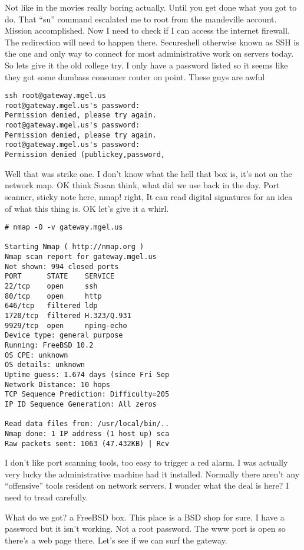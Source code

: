 Not like in the movies really boring actually. Until you get done what you got to do. That ``su'' command escalated me to root from the mandeville account. Mission accomplished. Now I need to check if I can access the internet firewall. The redirection will need to happen there. Secureshell otherwise known as SSH is the one and only way to connect for most administrative work on servers today. So lets give it the old college try. I only have a password listed so it seems like they got some dumbass consumer router on point. These guys are awful

\begin{verbatim}
ssh root@gateway.mgel.us
root@gateway.mgel.us's password: 
Permission denied, please try again.
root@gateway.mgel.us's password: 
Permission denied, please try again.
root@gateway.mgel.us's password: 
Permission denied (publickey,password,
\end{verbatim}

Well that was strike one. I don't know what the hell that box is, it's not on the network map. OK think Susan think, what did we use back in the day. Port scanner, sticky note here, nmap! right, It can read digital signatures for an idea of what this thing is. OK let's give it a whirl.

\begin{verbatim}
# nmap -O -v gateway.mgel.us

Starting Nmap ( http://nmap.org )
Nmap scan report for gateway.mgel.us 
Not shown: 994 closed ports
PORT      STATE    SERVICE
22/tcp    open     ssh
80/tcp    open     http
646/tcp   filtered ldp
1720/tcp  filtered H.323/Q.931
9929/tcp  open     nping-echo
Device type: general purpose
Running: FreeBSD 10.2
OS CPE: unknown
OS details: unknown
Uptime guess: 1.674 days (since Fri Sep
Network Distance: 10 hops
TCP Sequence Prediction: Difficulty=205
IP ID Sequence Generation: All zeros

Read data files from: /usr/local/bin/..
Nmap done: 1 IP address (1 host up) sca
Raw packets sent: 1063 (47.432KB) | Rcv
\end{verbatim}

I don't like port scanning tools, too easy to trigger a red alarm. I was actually very lucky the administrative machine had it installed. Normally there aren't any ``offensive'' tools resident on network servers. I wonder what the deal is here? I need to tread carefully.

What do we got? a FreeBSD box. This place is a BSD shop for sure. I have a password but it isn't working. Not a root password. The www port is open so there's a web page there. Let's see if we can surf the gateway.

